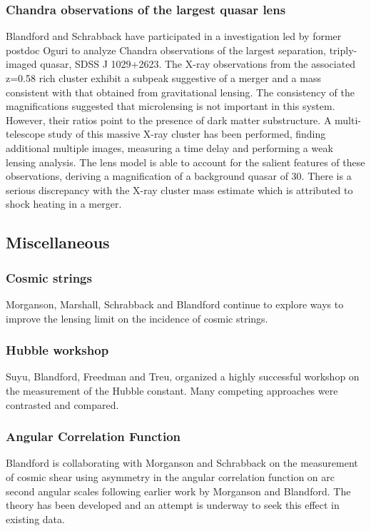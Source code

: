 \documentclass[psfig,11pt]{article}
\begin{document}
{\subsubsection{Chandra observations of the largest quasar lens}
Blandford and Schrabback have participated in a investigation led by former postdoc Oguri to analyze Chandra observations of the largest separation, triply-imaged quasar, SDSS J 1029+2623. The X-ray observations from the associated z=0.58 rich cluster exhibit a subpeak suggestive of a merger and a mass consistent with that obtained from gravitational lensing. The consistency of the magnifications suggested that microlensing is not important in this system. However, their ratios point to the presence of dark matter substructure. A multi-telescope study of this massive X-ray cluster has been performed, finding additional multiple images, measuring a time delay and performing a weak lensing analysis. The lens model is able to account for the salient features of these observations, deriving a magnification of a background quasar of 30. There is a serious discrepancy with the X-ray cluster mass estimate which is attributed to shock heating in a merger.
\subsection{Miscellaneous}
\subsubsection{Cosmic strings}
Morganson, Marshall, Schrabback and Blandford continue to explore ways to improve the lensing limit on the incidence of cosmic strings.
\subsubsection{Hubble workshop}
Suyu, Blandford, Freedman and Treu, organized a highly successful workshop on the measurement of the Hubble constant. Many competing approaches were contrasted and compared.
\subsubsection{Angular Correlation Function}
Blandford is collaborating with Morganson and Schrabback on the measurement of cosmic shear using asymmetry in the angular correlation function on arc second angular scales following earlier work by Morganson and Blandford. The theory has been developed and an attempt is underway to seek this effect in existing data.
}
\end{document}
